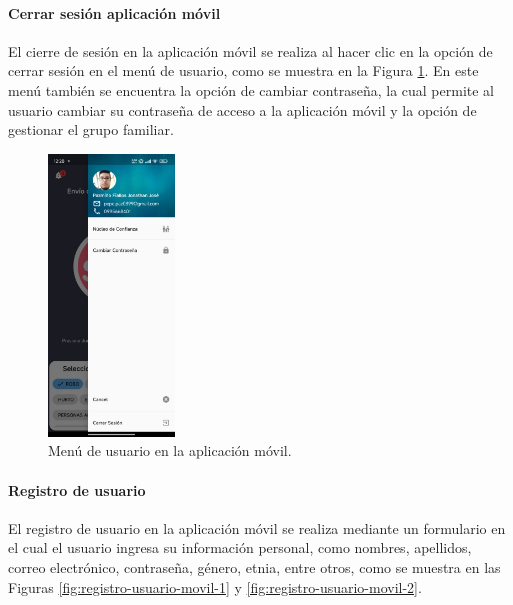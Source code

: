 \paragraph{Cerrar sesión aplicación móvil}

El cierre de sesión en la aplicación móvil se realiza al hacer clic en la opción de cerrar sesión en el menú de usuario, como se muestra
en la Figura \ref{fig:menu-usuario-movil}. En este menú también se encuentra la opción de cambiar contraseña, la cual permite al usuario
cambiar su contraseña de acceso a la aplicación móvil y la opción de gestionar el grupo familiar.

\begin{figure}[H]
    \centering
    \includegraphics[width=0.3\textwidth]{chapters/III-resultados-y-discusion/resources/images/menu-usuario-movil.png}
    \caption{Menú de usuario en la aplicación móvil.}
    \label{fig:menu-usuario-movil}
\end{figure}

\paragraph{Registro de usuario}
El registro de usuario en la aplicación móvil se realiza mediante un formulario en el cual el usuario ingresa su información personal,
como nombres, apellidos, correo electrónico, contraseña, género, etnia, entre otros, como se muestra en las Figuras \ref{fig:registro-usuario-movil-1}
y \ref{fig:registro-usuario-movil-2}.

